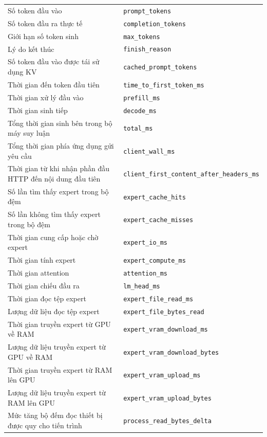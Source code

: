 \begin{longtable}{>{\RaggedRight\arraybackslash}p{6.8cm} >{\RaggedRight\arraybackslash}p{8.7cm}}
Số token đầu vào & \texttt{prompt\_tokens} \\
Số token đầu ra thực tế & \texttt{completion\_tokens} \\
Giới hạn số token sinh & \texttt{max\_tokens} \\
Lý do kết thúc & \texttt{finish\_reason} \\
Số token đầu vào được tái sử dụng KV & \texttt{cached\_prompt\_tokens} \\
Thời gian đến token đầu tiên & \texttt{time\_to\_first\_token\_ms} \\
Thời gian xử lý đầu vào & \texttt{prefill\_ms} \\
Thời gian sinh tiếp & \texttt{decode\_ms} \\
Tổng thời gian sinh bên trong bộ máy suy luận & \texttt{total\_ms} \\
Tổng thời gian phía ứng dụng gửi yêu cầu & \texttt{client\_wall\_ms} \\
Thời gian từ khi nhận phần đầu HTTP đến nội dung đầu tiên & \texttt{client\_first\_content\_after\_headers\_ms} \\
Số lần tìm thấy expert trong bộ đệm & \texttt{expert\_cache\_hits} \\
Số lần không tìm thấy expert trong bộ đệm & \texttt{expert\_cache\_misses} \\
Thời gian cung cấp hoặc chờ expert & \texttt{expert\_io\_ms} \\
Thời gian tính expert & \texttt{expert\_compute\_ms} \\
Thời gian attention & \texttt{attention\_ms} \\
Thời gian chiếu đầu ra & \texttt{lm\_head\_ms} \\
Thời gian đọc tệp expert & \texttt{expert\_file\_read\_ms} \\
Lượng dữ liệu đọc tệp expert & \texttt{expert\_file\_bytes\_read} \\
Thời gian truyền expert từ GPU về RAM & \texttt{expert\_vram\_download\_ms} \\
Lượng dữ liệu truyền expert từ GPU về RAM & \texttt{expert\_vram\_download\_bytes} \\
Thời gian truyền expert từ RAM lên GPU & \texttt{expert\_vram\_upload\_ms} \\
Lượng dữ liệu truyền expert từ RAM lên GPU & \texttt{expert\_vram\_upload\_bytes} \\
Mức tăng bộ đếm đọc thiết bị được quy cho tiến trình & \texttt{process\_read\_bytes\_delta} \\

\end{longtable}
\endgroup


